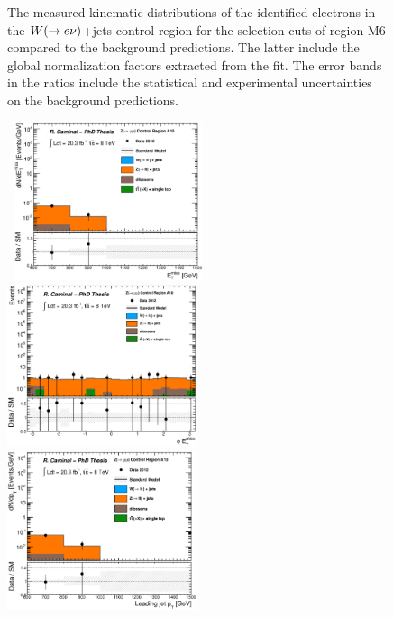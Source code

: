 \begin{figure}[!ht]
\begin{center}
{    }
  \end{center}
  \caption[Kinematic distributions of the identified electrons in the $\wen$+jets control region for the selection cuts of region M6, after the normalization factors extracted from the fit have been applied.]{The measured kinematic distributions of the identified electrons in the $\wen$+jets control region for the selection cuts of region M6 compared to the background predictions. The latter include the global normalization factors extracted from the fit. The error bands in the ratios include the statistical and experimental uncertainties on the background predictions.}
  \label{fig:Plot_M6_CRele_Leptonkinematics}
\end{figure}


\begin{figure}[!ht]
  \begin{center}
    \mbox{
      \includegraphics[width=0.495\textwidth]{Appendix_FluctuationM6/Figures/plot_Stop_A10_CRzmm_met_fitted.eps}
      \includegraphics[width=0.495\textwidth]{Appendix_FluctuationM6/Figures/plot_Stop_A10_CRzmm_met_phi_fitted.eps}
    }
    \mbox{
      \includegraphics[width=0.495\textwidth]{Appendix_FluctuationM6/Figures/plot_Stop_A10_CRzmm_pt1_fitted.eps}
}
\end{center}
\end{figure}
